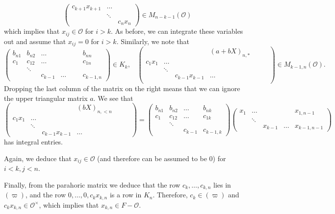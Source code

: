 \documentclass{amsart}
\theoremstyle{definition}
\begin{document}
{\[\begin{pmatrix}
c_{k+1}x_{k+1}&\ldots&\\&\ddots&\\&&c_nx_n\end{pmatrix}\in
M_{n-k-1}(\mathcal{O})\]
which implies that $x_{ij}\in \mathcal{O}$ for $i>k$. As before,
we can integrate these variables out and assume that $x_{ij}=0$
for $i>k$. Similarly, we note that
\[\begin{pmatrix}          b_{n1}&b_{n2}&\ldots &&&&b_{nn}\\
c_{1}&c_{12}&\ldots &&&&c_{1n}\\
        &\ddots&       &&&& \\
        &      &c_{k-1}&\ldots &&&c_{k-1,n} \end{pmatrix}\in K_k,\ \ \ \ \begin{pmatrix}         &&&(a+bX)_{n,*}&&&\\
        c_{1}x_{1}&\ldots&&&&&\\
        &\ddots&&&&&\\
        &&
        c_{k-1}x_{k-1}&\ldots&&&\\
\end{pmatrix}\in M_{k-1,n}(\mathcal{O}).\]
Dropping the last column of the matrix on the right means that
we can ignore the upper triangular matrix $a$. We see that
\[\begin{pmatrix}         &&&(bX)_{n,<n}&&&\\
c_{1}x_{1}&\ldots&&&&&\\
        &\ddots&&&&&\\
        &&
        c_{k-1}x_{k-1}&\ldots&&&
        \end{pmatrix}=\begin{pmatrix}  b_{n1}&b_{n2}&\ldots &b_{nk}\\
        c_{1}&c_{12}&\ldots &c_{1k}\\
        &\ddots&       & \\
        &      &c_{k-1}&c_{k-1,k}
         \end{pmatrix}
        \begin{pmatrix}x_1&\ldots&&&x_{1,n-1}\\
        &\ddots&&&\\
        &&x_{k-1}&\ldots&x_{k-1,n-1}\end{pmatrix}\]
        has integral entries.

Again, we deduce that $x_{ij}\in \mathcal{O}$ (and therefore can
be assumed to be 0) for $i<k,j<n$.

Finally, from the parahoric matrix we deduce that the row
$c_k,\ldots, c_{k,n}$ lies in $(\varpi)$, and the row $0,\ldots,
0, c_kx_{k,n}$ is a row in $K_n$. Therefore, $c_k\in (\varpi)$
and $c_k x_{k,n}\in \mathcal{O}^\times$, which implies that
$x_{k,n}\in F-\mathcal{O}$.

}
\end{document}
